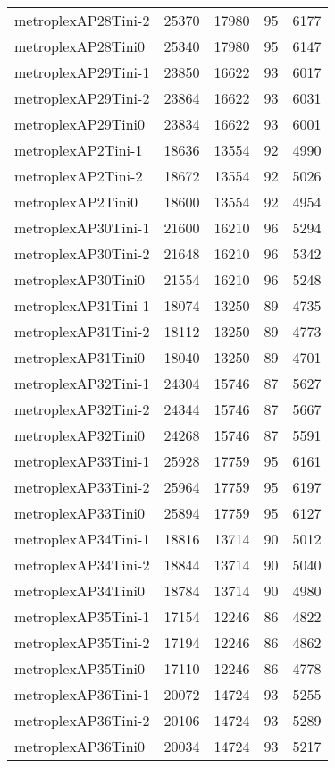 \begin{longtable}{lrrrr}
metroplexAP28Tini-2 & 25370 & 17980 & 95 & 6177 \\
metroplexAP28Tini0 & 25340 & 17980 & 95 & 6147 \\
metroplexAP29Tini-1 & 23850 & 16622 & 93 & 6017 \\
metroplexAP29Tini-2 & 23864 & 16622 & 93 & 6031 \\
metroplexAP29Tini0 & 23834 & 16622 & 93 & 6001 \\
metroplexAP2Tini-1 & 18636 & 13554 & 92 & 4990 \\
metroplexAP2Tini-2 & 18672 & 13554 & 92 & 5026 \\
metroplexAP2Tini0 & 18600 & 13554 & 92 & 4954 \\
metroplexAP30Tini-1 & 21600 & 16210 & 96 & 5294 \\
metroplexAP30Tini-2 & 21648 & 16210 & 96 & 5342 \\
metroplexAP30Tini0 & 21554 & 16210 & 96 & 5248 \\
metroplexAP31Tini-1 & 18074 & 13250 & 89 & 4735 \\
metroplexAP31Tini-2 & 18112 & 13250 & 89 & 4773 \\
metroplexAP31Tini0 & 18040 & 13250 & 89 & 4701 \\
metroplexAP32Tini-1 & 24304 & 15746 & 87 & 5627 \\
metroplexAP32Tini-2 & 24344 & 15746 & 87 & 5667 \\
metroplexAP32Tini0 & 24268 & 15746 & 87 & 5591 \\
metroplexAP33Tini-1 & 25928 & 17759 & 95 & 6161 \\
metroplexAP33Tini-2 & 25964 & 17759 & 95 & 6197 \\
metroplexAP33Tini0 & 25894 & 17759 & 95 & 6127 \\
metroplexAP34Tini-1 & 18816 & 13714 & 90 & 5012 \\
metroplexAP34Tini-2 & 18844 & 13714 & 90 & 5040 \\
metroplexAP34Tini0 & 18784 & 13714 & 90 & 4980 \\
metroplexAP35Tini-1 & 17154 & 12246 & 86 & 4822 \\
metroplexAP35Tini-2 & 17194 & 12246 & 86 & 4862 \\
metroplexAP35Tini0 & 17110 & 12246 & 86 & 4778 \\
metroplexAP36Tini-1 & 20072 & 14724 & 93 & 5255 \\
metroplexAP36Tini-2 & 20106 & 14724 & 93 & 5289 \\
metroplexAP36Tini0 & 20034 & 14724 & 93 & 5217 \\

\end{longtable}
